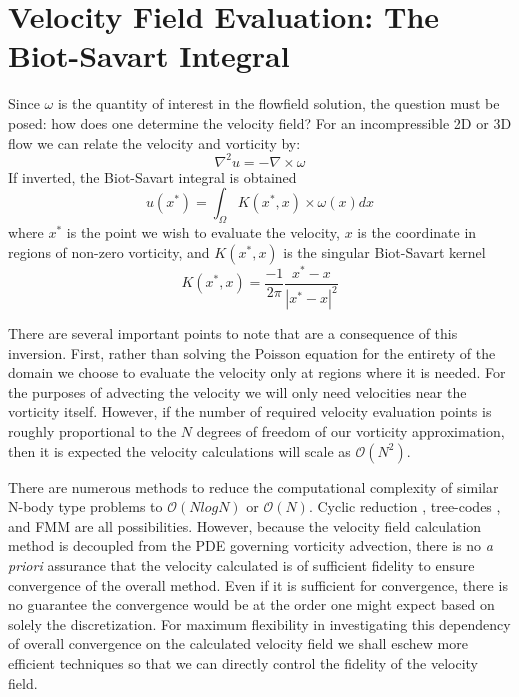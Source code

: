 \documentclass[letterpaper,12pt]{report}
\newcommand{\be}{\begin{equation}}
\newcommand{\ben}[1]{\begin{equation}\label{#1}}
\newcommand{\ee}{\end{equation}}
\begin{document}
\section{Velocity Field Evaluation: The Biot-Savart Integral}
Since $\omega$ is the quantity of interest in the flowfield solution, the question must be posed: how does one determine the velocity field? For an incompressible 2D or 3D flow we can relate the velocity and vorticity by:
\be \nabla^2 u = -\nabla \times \omega \ee
If inverted, the Biot-Savart integral is obtained
\ben{BS} u(x^*) = \int_\Omega K(x^*,x) \times \omega(x) dx \ee
where $x^*$ is the point we wish to evaluate the velocity, $x$ is the coordinate in regions of non-zero vorticity, and $K(x^*,x)$ is the singular Biot-Savart kernel \cite{BealeMajda}
\ben{BSkern} K(x^*,x) = \frac{-1}{2 \pi} \frac{x^*-x}{|x^*-x|^2} \ee

There are several important points to note that are a consequence of this inversion. First, rather than solving the Poisson equation for the entirety of the domain we choose to evaluate the velocity only at regions where it is needed. For the purposes of advecting the velocity we will only need velocities near the vorticity itself. However, if the number of required velocity evaluation points is roughly proportional to the $N$ degrees of freedom of our vorticity approximation, then it is expected the velocity calculations will scale as $\mathcal{O}(N^2)$.

There are numerous methods to reduce the computational complexity of similar N-body type problems to $\mathcal{O}(NlogN)$ or $\mathcal{O}(N)$. Cyclic reduction \cite{SchumannSweet1976}, tree-codes \cite{LindsayKrasny2001,BarnesHut1986}, and FMM \cite{GreengardRokhlin1987} are all possibilities. However, because the velocity field calculation method is decoupled from the PDE governing vorticity advection, there is no \textit{a priori} assurance that the velocity calculated is of sufficient fidelity to ensure convergence of the overall method. Even if it is sufficient for convergence, there is no guarantee the convergence would be at the order one might expect based on solely the discretization. For maximum flexibility in investigating this dependency of overall convergence on the calculated velocity field we shall eschew more efficient techniques so that we can directly control the fidelity of the velocity field.
\end{document}
